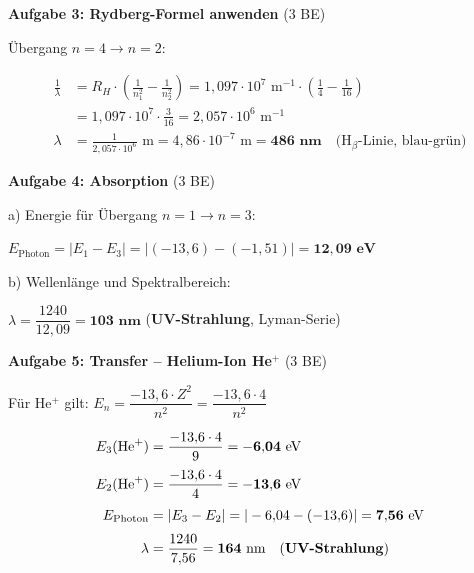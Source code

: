 \documentclass[11pt,a4paper]{article}
\begin{document}

\textbf{Aufgabe 3: Rydberg-Formel anwenden} \hfill (3 BE)

Übergang $n = 4 \to n = 2$:

\begin{tcolorbox}[loesungbox]
\begin{align*}
\frac{1}{\lambda} &= R_H \cdot \left( \frac{1}{n_1^2} - \frac{1}{n_2^2} \right) = 1{,}097 \cdot 10^7 \text{ m}^{-1} \cdot \left( \frac{1}{4} - \frac{1}{16} \right) \\[0.5em]
&= 1{,}097 \cdot 10^7 \cdot \frac{3}{16} = 2{,}057 \cdot 10^6 \text{ m}^{-1} \\[0.5em]
\lambda &= \frac{1}{2{,}057 \cdot 10^6} \text{ m} = 4{,}86 \cdot 10^{-7} \text{ m} = \mathbf{486 \text{ nm}} \quad \text{(H$_\beta$-Linie, blau-grün)}
\end{align*}
\end{tcolorbox}


\textbf{Aufgabe 4: Absorption} \hfill (3 BE)

a) Energie für Übergang $n = 1 \to n = 3$:

\begin{tcolorbox}[loesungbox]
$E_{\text{Photon}} = |E_1 - E_3| = |(-13{,}6) - (-1{,}51)| = \mathbf{12{,}09 \text{ eV}}$
\end{tcolorbox}

b) Wellenlänge und Spektralbereich:

\begin{tcolorbox}[loesungbox]
$\lambda = \dfrac{1240}{12{,}09} = \mathbf{103 \text{ nm}}$ \quad (\textbf{UV-Strahlung}, Lyman-Serie)
\end{tcolorbox}


\textbf{Aufgabe 5: Transfer -- Helium-Ion He$^+$} \hfill (3 BE)

\begin{tcolorbox}[loesungbox]
Für He$^+$ gilt: $E_n = \dfrac{-13{,}6 \cdot Z^2}{n^2} = \dfrac{-13{,}6 \cdot 4}{n^2}$

\begin{align*}
E_3(\text{He}^+) &= \frac{-13{,}6 \cdot 4}{9} = \mathbf{-6{,}04 \text{ eV}} \\[0.3em]
E_2(\text{He}^+) &= \frac{-13{,}6 \cdot 4}{4} = \mathbf{-13{,}6 \text{ eV}} \\[0.3em]
E_{\text{Photon}} &= |E_3 - E_2| = |-6{,}04 - (-13{,}6)| = \mathbf{7{,}56 \text{ eV}} \\[0.3em]
\lambda &= \frac{1240}{7{,}56} = \mathbf{164 \text{ nm}} \quad \text{(\textbf{UV-Strahlung})}
\end{align*}
\end{tcolorbox}
\end{document}
